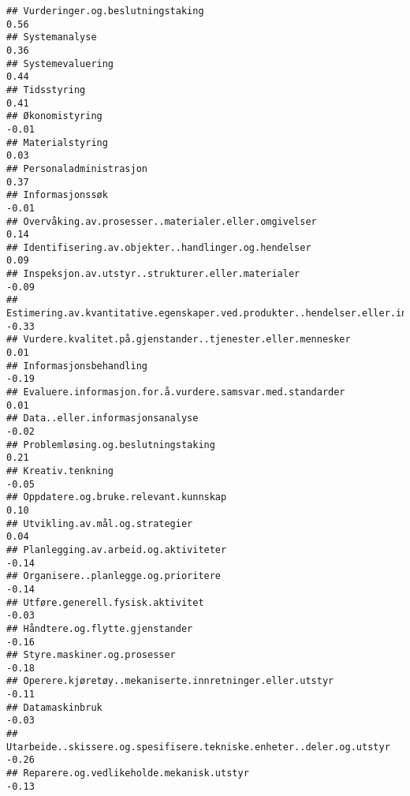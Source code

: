 \documentclass[
]{article}
\begin{document}
\begin{verbatim}
## Vurderinger.og.beslutningstaking                                                  0.56
## Systemanalyse                                                                     0.36
## Systemevaluering                                                                  0.44
## Tidsstyring                                                                       0.41
## Økonomistyring                                                                   -0.01
## Materialstyring                                                                   0.03
## Personaladministrasjon                                                            0.37
## Informasjonssøk                                                                  -0.01
## Overvåking.av.prosesser..materialer.eller.omgivelser                              0.14
## Identifisering.av.objekter..handlinger.og.hendelser                               0.09
## Inspeksjon.av.utstyr..strukturer.eller.materialer                                -0.09
## Estimering.av.kvantitative.egenskaper.ved.produkter..hendelser.eller.informasjon -0.33
## Vurdere.kvalitet.på.gjenstander..tjenester.eller.mennesker                        0.01
## Informasjonsbehandling                                                           -0.19
## Evaluere.informasjon.for.å.vurdere.samsvar.med.standarder                         0.01
## Data..eller.informasjonsanalyse                                                  -0.02
## Problemløsing.og.beslutningstaking                                                0.21
## Kreativ.tenkning                                                                 -0.05
## Oppdatere.og.bruke.relevant.kunnskap                                              0.10
## Utvikling.av.mål.og.strategier                                                    0.04
## Planlegging.av.arbeid.og.aktiviteter                                             -0.14
## Organisere..planlegge.og.prioritere                                              -0.14
## Utføre.generell.fysisk.aktivitet                                                 -0.03
## Håndtere.og.flytte.gjenstander                                                   -0.16
## Styre.maskiner.og.prosesser                                                      -0.18
## Operere.kjøretøy..mekaniserte.innretninger.eller.utstyr                          -0.11
## Datamaskinbruk                                                                   -0.03
## Utarbeide..skissere.og.spesifisere.tekniske.enheter..deler.og.utstyr             -0.26
## Reparere.og.vedlikeholde.mekanisk.utstyr                                         -0.13

\end{verbatim}
\end{document}
